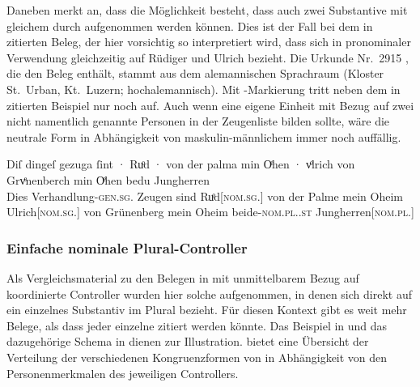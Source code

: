 \label{phsec:jungherren}
Daneben merkt \citet[384]{paul2007} an, dass die Möglichkeit besteht, dass auch
zwei Substantive mit gleichem  durch 
aufgenommen werden können. Dies ist der Fall bei dem in
 zitierten Beleg, der hier vorsichtig so
interpretiert wird, dass sich   in pronominaler Verwendung
gleichzeitig auf Rüdiger und Ulrich bezieht. Die Urkunde Nr.~2915
\autocite[213,14--42]{cao4}, die den Beleg enthält, stammt aus dem
alemannischen Sprachraum (Kloster
St.~Urban, Kt.~Luzern; hochalemannisch). Mit
-Markierung tritt neben dem in  zitierten
Beispiel nur noch  
\autocites(Nr.~2915)[213.27]{cao4} auf. Auch wenn 
 eine eigene Einheit mit Bezug auf zwei nicht namentlich
genannte Personen in der Zeugenliste bilden sollte, wäre die neutrale Form
 in Abhängigkeit von maskulin-männlichem  immer noch
auffällig.

\begin{exe}
\ex \label{ex:beid2coordncao1_2}
	\gll Diſ dingeſ gezuga ſint · Ruͦd · von der palma
			min Oͤhen · vͦlrich von Grvͤnenberch min Oͤhen bedu Jungherren
			\textelp{} \\
		Dies Verhandlung-\textsc{gen.sg.\NeutI} Zeugen sind {}
			Ruͦd[\textsc{nom.sg.\MascM}] {} von der Palme mein Oheim {}
			Ulrich[\textsc{nom.sg.\MascM}] von Grünenberg mein Oheim
			beide-\textsc{nom.pl.\NeutM.st}
			Jungherren[\textsc{nom.pl.\MascM}] {} \\
	\trans {}
			\parencites(Nr.~2915, Kl.~St.~Urban, Kt.~Luzern, 1298)[213,33--35]{cao4}
\end{exe}

\subsubsection{Einfache nominale Plural-Controller}
\label{subsubsec:persplnp}

Als Vergleichsmaterial zu den Belegen in  mit
unmittelbarem Bezug auf koordinierte Controller wurden hier solche aufgenommen,
in denen sich  direkt auf ein einzelnes Substantiv im Plural
bezieht. Für diesen Kontext gibt es weit mehr Belege, als dass jeder einzelne
zitiert werden könnte. Das Beispiel in  und das
dazugehörige Schema in  dienen zur Illustration.
 bietet eine Übersicht der Verteilung der verschiedenen
Kongruenz\-formen von  in Abhängigkeit von den Personenmerkmalen
des jeweiligen Controllers.

